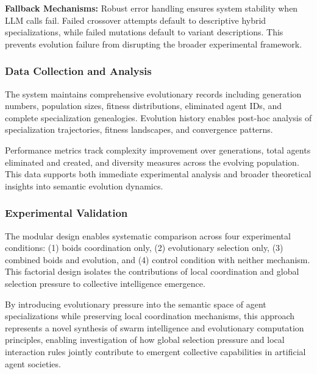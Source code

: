 \textbf{Fallback Mechanisms:} Robust error handling ensures system stability when LLM calls fail. Failed crossover attempts default to descriptive hybrid specializations, while failed mutations default to variant descriptions. This prevents evolution failure from disrupting the broader experimental framework.

\subsubsection{Data Collection and Analysis}

The system maintains comprehensive evolutionary records including generation numbers, population sizes, fitness distributions, eliminated agent IDs, and complete specialization genealogies. Evolution history enables post-hoc analysis of specialization trajectories, fitness landscapes, and convergence patterns.

Performance metrics track complexity improvement over generations, total agents eliminated and created, and diversity measures across the evolving population. This data supports both immediate experimental analysis and broader theoretical insights into semantic evolution dynamics.

\subsubsection{Experimental Validation}

The modular design enables systematic comparison across four experimental conditions: (1) boids coordination only, (2) evolutionary selection only, (3) combined boids and evolution, and (4) control condition with neither mechanism. This factorial design isolates the contributions of local coordination and global selection pressure to collective intelligence emergence.

By introducing evolutionary pressure into the semantic space of agent specializations while preserving local coordination mechanisms, this approach represents a novel synthesis of swarm intelligence and evolutionary computation principles, enabling investigation of how global selection pressure and local interaction rules jointly contribute to emergent collective capabilities in artificial agent societies.
